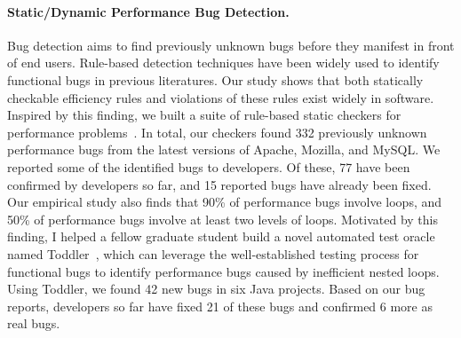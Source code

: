 \documentclass[10pt]{article}
\begin{document}
\paragraph{Static/Dynamic Performance Bug Detection.}
Bug detection aims to find previously unknown bugs
before they manifest in front of end users. 
Rule-based detection techniques have been widely used to identify 
functional bugs in previous literatures.
Our study shows that both statically checkable efficiency rules 
and violations of these rules exist widely in software. 
Inspired by this finding,
we built a suite of rule-based static checkers for performance problems~\cite{jin12perfbug}.
In total, our checkers found 332 previously unknown performance bugs 
from the latest versions of Apache, Mozilla, and MySQL. 
We reported some of the identified bugs to developers. 
Of these, 77 have been confirmed by developers so far, 
and 15 reported bugs have already been fixed.
Our empirical study also finds that 90\% of performance bugs involve loops, 
and 50\% of performance bugs involve at least two levels of loops. 
Motivated by this finding, I helped a fellow graduate student 
build a novel automated test oracle named Toddler~\cite{Nistor13ICSE},
which can leverage the well-established testing process for functional bugs to 
identify performance bugs caused by inefficient nested loops. 
Using Toddler, we found 42 new bugs in six Java projects.
Based on our bug reports, developers so far have fixed 21 of these bugs 
and confirmed 6 more as real bugs. 

\vspace{-.1in}
\end{document}
